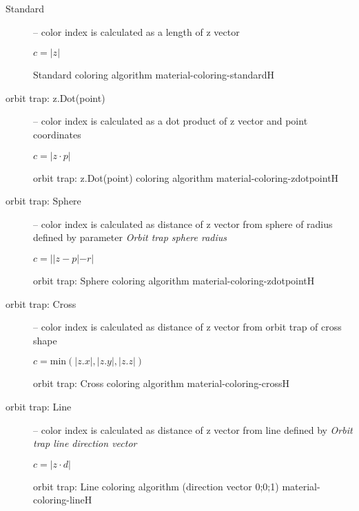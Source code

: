 \begin{description}
	\item[Standard] -- color index is calculated as a length of z vector
	\begin{center}
		\(c = |z|\)
	\end{center}
	{Standard coloring algorithm}
	{material-coloring-standard}{H}
	
	\item[orbit trap: z.Dot(point)] -- color index is calculated as a dot product of z vector and point coordinates
	\begin{center}
		\(c = |z \cdot p|\)
	\end{center}
	{orbit trap: z.Dot(point) coloring algorithm}
	{material-coloring-zdotpoint}{H}
	
	\item[orbit trap: Sphere] -- color index is calculated as distance of z vector from sphere of radius defined by parameter \emph{Orbit trap sphere radius}
	\begin{center}
		\(c = ||z - p|-r|\)
	\end{center}
	{orbit trap: Sphere coloring algorithm}
	{material-coloring-zdotpoint}{H}
	
	\item[orbit trap: Cross] -- color index is calculated as distance of z vector from orbit trap of cross shape
	\begin{center}
		\(c = \mathrm{min}(|z.x|, |z.y|, |z.z|)\)
	\end{center}
	{orbit trap: Cross coloring algorithm}
	{material-coloring-cross}{H}
	
	\item[orbit trap: Line] -- color index is calculated as distance of z vector from line defined by \emph{Orbit trap line direction vector}
	\begin{center}
		\(c = |z \cdot d|\)
	\end{center}
	{orbit trap: Line coloring algorithm (direction vector 0;0;1)}
	{material-coloring-line}{H}
\end{description}

